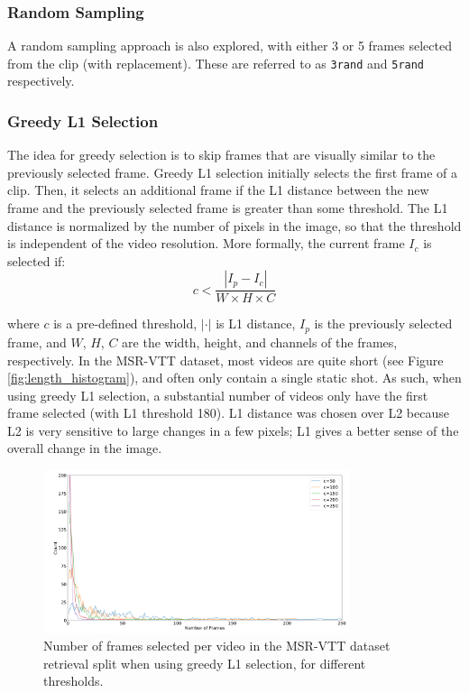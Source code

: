 \subsubsection{Random Sampling}
A random sampling approach is also explored, with either 3 or 5 frames selected from the clip (with replacement).
These are referred to as \verb|3rand| and \verb|5rand| respectively.

\subsubsection{Greedy L1 Selection}
The idea for greedy selection is to skip frames that are visually similar to the previously selected frame.
Greedy L1 selection initially selects the first frame of a clip. 
Then, it selects an additional frame if the L1 distance between the new frame and the previously selected frame is greater than some threshold.
The L1 distance is normalized by the number of pixels in the image, so that the threshold is independent of the video resolution.
More formally, the current frame $I_{c}$ is selected if:
\begin{equation}
      c < \frac{|I_{p} - I_{c}|}{W \times H \times C}
\end{equation}

where $c$ is a pre-defined threshold, $|\cdot|$ is L1 distance, $I_{p}$ is the previously selected frame, and $W$, $H$, $C$ are the width, height, and channels of the frames, respectively.
In the MSR-VTT dataset, most videos are quite short (see Figure \ref{fig:length_histogram}), and often only contain a single static shot.
As such, when using greedy L1 selection, a substantial number of videos only have the first frame selected (with L1 threshold 180).
L1 distance was chosen over L2 because L2 is very sensitive to large changes in a few pixels; L1 gives a better sense of the overall change in the image.

\begin{figure}
      \centering
      \includegraphics[width=0.8\textwidth]{figures/num_frames_histogram.png}
      \caption{Number of frames selected per video in the MSR-VTT dataset retrieval split when using greedy L1 selection, for different thresholds.}
      \label{fig:optical_flow}
\end{figure}



